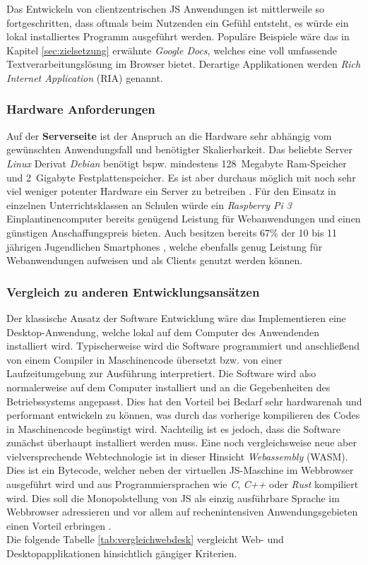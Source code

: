  
 Das Entwickeln von clientzentrischen JS Anwendungen ist mittlerweile so fortgeschritten, dass oftmals beim Nutzenden ein Gefühl entsteht, es würde ein lokal installiertes Programm ausgeführt werden. Populäre Beispiele wäre das in Kapitel \ref{sec:zielsetzung} erwähnte \emph{Google Docs}, welches eine voll umfassende Textverarbeitungslösung im Browser bietet. Derartige Applikationen werden \emph{Rich Internet Application} (RIA) genannt.
 

\subsubsection{Hardware Anforderungen}\label{sec:hardware}
Auf der \textbf{Serverseite} ist der Anspruch an die Hardware sehr abhängig vom gewünschten Anwendungsfall und benötigter Skalierbarkeit. Das beliebte Server \emph{Linux} Derivat \emph{Debian} benötigt bspw. mindestens 128~Megabyte Ram-Speicher und 2~Gigabyte Festplattenspeicher. Es ist aber durchaus möglich mit noch sehr viel weniger potenter Hardware ein Server zu betreiben \cite{dpakt2019:online}. 
Für den Einsatz in einzelnen Unterrichtsklassen an Schulen würde ein \emph{Raspberry Pi 3} Einplantinencomputer bereits genügend Leistung für Webanwendungen und einen günstigen Anschaffungspreis bieten. Auch besitzen bereits 67\% der 10 bis 11 jährigen Jugendlichen Smartphones \cite{Statista2017:online}, welche ebenfalls genug Leistung für Webanwendungen aufweisen und als Clients genutzt werden können. \\ 
\subsubsection{Vergleich zu anderen Entwicklungsansätzen}\label{sec:vorundnachteileweb}
Der klassische Ansatz der Software Entwicklung wäre das Implementieren eine Desktop-Anwendung, welche lokal
auf dem Computer des Anwendenden installiert wird. Typischerweise wird die Software programmiert und anschließend von einem Compiler in Maschinencode übersetzt bzw. von einer Laufzeitumgebung zur Ausführung interpretiert. Die Software wird also normalerweise auf dem Computer installiert und an die Gegebenheiten des Betriebssystems angepasst. Dies hat den Vorteil bei Bedarf sehr hardwarenah und performant entwickeln zu können, was durch das vorherige kompilieren des Codes in Maschinencode begünstigt wird. Nachteilig ist es jedoch, dass die Software zunächst überhaupt installiert werden muss. Eine noch vergleichsweise neue aber vielversprechende Webtechnologie ist in dieser Hinsicht \emph{Webassembly} (WASM). Dies ist ein Bytecode, welcher neben der virtuellen JS-Maschine im Webbrowser ausgeführt wird und aus Programmiersprachen wie \emph{C}, \emph{C++} oder \emph{Rust} kompiliert wird. Dies soll die Monopolstellung von JS als einzig ausführbare Sprache im Webbrowser adressieren und vor allem auf rechenintensiven Anwendungsgebieten einen Vorteil erbringen \cite{Stueckler2018}. \\  Die folgende Tabelle \ref{tab:vergleichwebdesk} vergleicht Web- und Desktopapplikationen hinsichtlich gängiger Kriterien.

